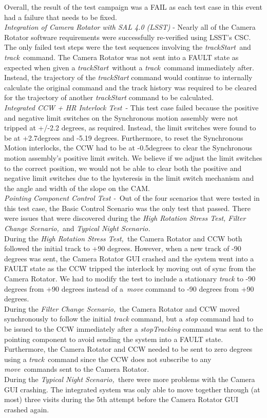 \documentclass[SE,lsstdraft,STR,toc]{lsstdoc}
\begin{document}
Overall, the result of the test campaign was a FAIL as each test case in
this event had a failure that needs to be
fixed.\\[2\baselineskip]\emph{Integration of Camera Rotator with SAL 4.0
(LSST)} - Nearly all of the Camera Rotator software requirements were
successfully re-verified using LSST's CSC. The only failed test steps
were the test sequences involving the \emph{trackStart~}and
\emph{track~}command. The Camera Rotator was not sent into a FAULT state
as expected when given a \emph{trackStart~}without a
\emph{track~}command immediately after. Instead, the trajectory of the
\emph{trackStart} command would continue to internally calculate the
original command and the track history was required to be cleared for
the trajectory of another \emph{trackStart} command to be
calculated.\\[2\baselineskip]\emph{Integrated CCW + HR Interlock Test~}-
This test case failed because the positive and negative limit switches
on the Synchronous motion assembly were not tripped at +/-2.2 degrees,
as required. Instead, the limit switches were found to be at +2.7degrees
and -5.19 degrees. Furthermore, to reset the Synchronous Motion
interlocks, the CCW had to be at -0.5degrees to clear the Synchronous
motion assembly's positive limit switch. We believe if we adjust the
limit switches to the correct position, we would not be able to clear
both the positive and negative limit switches due to the hysteresis in
the limit switch mechanism and the angle and width of the slope on the
CAM.\\[2\baselineskip]\emph{Pointing Component Control Test -~}Out of
the four scenarios that were tested in this test case, the Basic Control
Scenario was the only test that passed. There were issues that were
discovered during the \emph{High Rotation Stress Test, Filter Change
Scenario,~}and \emph{Typical Night Scenario.}\\
During the \emph{High Rotation Stress Test,~}the Camera Rotator and CCW
both followed the initial track to +90 degrees. However, when a new
track of -90 degrees was sent, the Camera Rotator GUI crashed and the
system went into a FAULT state as the CCW tripped the interlock by
moving out of sync from the Camera Rotator. We had to modify the test to
include a stationary \emph{track} to -90 degrees from +90 degrees
instead of a~\emph{move} command to -90 degrees from +90 degrees.\\
During the \emph{Filter Change Scenario,~}the Camera Rotator and CCW
moved synchronously to follow the initial \emph{track} command, but a
\emph{stop} command had to be issued to the CCW immediately after a
\emph{stopTracking} command was sent to the pointing component to avoid
sending the system into a FAULT state. Furthermore, the Camera Rotator
and CCW needed to be sent to zero degrees using a \emph{track~}command
since the CCW does not subscribe to any \emph{move~}commands sent to the
Camera Rotator.\\
During the \emph{Typical Night Scenario,~}there were more problems with
the Camera GUI crashing. The integrated system was only able to move
together through (at most) three visits during the 5th attempt before
the Camera Rotator GUI crashed again.~
\end{document}
